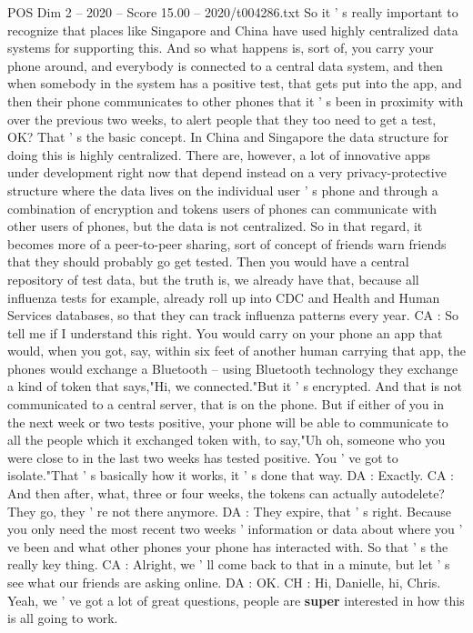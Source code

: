 \begin{textsample}{POS Dim 2 – 2020 – Score 15.00 – 2020/t004286.txt}
So it ' s really important to recognize that places like Singapore and China have used highly centralized data systems for supporting this.
And so what happens is, sort of, you carry your phone around, and everybody is connected to a central data system, and then when somebody in the system has a positive test, that gets put into the app, and then their phone communicates to other phones that it ' s been in proximity with over the previous two weeks, to alert people that they too need to get a test, OK?
That ' s the basic concept.
In China and Singapore the data structure for doing this is highly centralized.
There are, however, a lot of innovative apps under development right now that depend instead on a very privacy-protective structure where the data lives on the individual user ' s phone and through a combination of encryption and tokens users of phones can communicate with other users of phones, but the data is not centralized.
So in that regard, it becomes more of a peer-to-peer sharing, sort of concept of friends warn friends that they should probably go get tested.
Then you would have a central repository of test data, but the truth is, we already have that, because all influenza tests for example, already roll up into CDC and Health and Human Services databases, so that they can track influenza patterns every year.
CA : So tell me if I understand this right.
You would carry on your phone an app that would, when you got, say, within six feet of another human carrying that app, the phones would exchange a Bluetooth -- using Bluetooth technology they exchange a kind of token that says,"Hi, we connected."But it ' s encrypted.
And that is not communicated to a central server, that is on the phone.
But if either of you in the next week or two tests positive, your phone will be able to communicate to all the people which it exchanged token with, to say,"Uh oh, someone who you were close to in the last two weeks has tested positive.
You ' ve got to isolate."That ' s basically how it works, it ' s done that way.
DA : Exactly.
CA : And then after, what, three or four weeks, the tokens can actually autodelete?
They go, they ' re not there anymore.
DA : They expire, that ' s right.
Because you only need the most recent two weeks ' information or data about where you ' ve been and what other phones your phone has interacted with.
So that ' s the really key thing.
CA : Alright, we ' ll come back to that in a minute, but let ' s see what our friends are asking online.
DA : OK.
CH : Hi, Danielle, hi, Chris.
Yeah, we ' ve got a lot of great questions, people are \textbf{super} interested in how this is all going to work.

\end{textsample}
